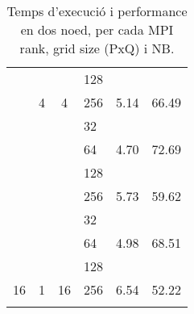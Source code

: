 \begin{longtable}{cccccc}
                      & {  }                                            & {  }                                            & \multicolumn{1}{l}{\cellcolor[HTML]{EFEFEF}128} & \cellcolor[HTML]{EFEFEF}{  4.52}     & \cellcolor[HTML]{EFEFEF}{  75.49}    \\
                      & \multirow{-4}{*}{{  4}}                         & \multirow{-4}{*}{{  4}}                         & \multicolumn{1}{l}{256}                         & {  5.14}                             & {  66.49}                            \\ \cline{2-6}
                      & \cellcolor[HTML]{EFEFEF}{  }                    & \cellcolor[HTML]{EFEFEF}{  }                    & \multicolumn{1}{l}{\cellcolor[HTML]{EFEFEF}32}  & \cellcolor[HTML]{EFEFEF}{  5.42}     & \cellcolor[HTML]{EFEFEF}{  63.05}    \\
                      & \cellcolor[HTML]{EFEFEF}{  }                    & \cellcolor[HTML]{EFEFEF}{  }                    & \multicolumn{1}{l}{64}                          & {  4.70}                             & {  72.69}                            \\
                      & \cellcolor[HTML]{EFEFEF}{  }                    & \cellcolor[HTML]{EFEFEF}{  }                    & \multicolumn{1}{l}{\cellcolor[HTML]{EFEFEF}128} & \cellcolor[HTML]{EFEFEF}{  4.96}     & \cellcolor[HTML]{EFEFEF}{  68.84}    \\
                      & \multirow{-4}{*}{\cellcolor[HTML]{EFEFEF}{  8}} & \multirow{-4}{*}{\cellcolor[HTML]{EFEFEF}{  2}} & \multicolumn{1}{l}{256}                         & {  5.73}                             & {  59.62}                            \\ \cline{2-6}
                      & {  }                                            & {  }                                            & \multicolumn{1}{l}{\cellcolor[HTML]{EFEFEF}32}  & \cellcolor[HTML]{EFEFEF}{  5.31}     & \cellcolor[HTML]{EFEFEF}{  64.37}    \\
                      & {  }                                            & {  }                                            & \multicolumn{1}{l}{64}                          & {  4.98}                             & {  68.51}                            \\
                      & {  }                                            & {  }                                            & \multicolumn{1}{l}{\cellcolor[HTML]{EFEFEF}128} & \cellcolor[HTML]{EFEFEF}{  5.40}     & \cellcolor[HTML]{EFEFEF}{  63.20}    \\
\multirow{-20}{*}{16} & \multirow{-4}{*}{{  1}}                         & \multirow{-4}{*}{{  16}}                        & \multicolumn{1}{l}{256}                         & {  6.54}                             & {  52.22} \\ \hline
    \caption{Temps d'execució i performance en dos noed, per cada MPI rank, grid size (PxQ) i NB.}
    \label{tab:hpl_two_global_perf}
\end{longtable}
